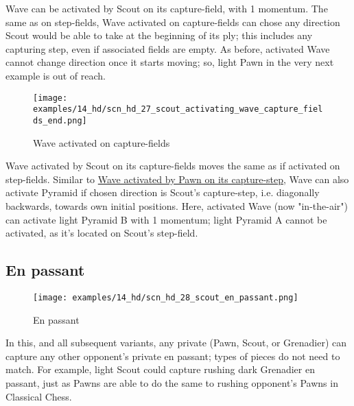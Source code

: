 \vspace*{-0.5\baselineskip}
Wave can be activated by Scout on its capture-field, with 1 momentum. The same as
on step-fields, Wave activated on capture-fields can chose any direction Scout would
be able to take at the beginning of its ply; this includes any capturing step, even
if associated fields are empty.\newline
\indent
As before, activated Wave cannot change direction once it starts moving; so, light
Pawn in the very next example is out of reach.

\clearpage %

\vspace*{-2.3\baselineskip}
\noindent
\begin{figure}[!h]
\texttt{[image: examples/14\_hd/scn\_hd\_27\_scout\_activating\_wave\_capture\_fields\_end.png]}
\vspace*{-1.4\baselineskip}
\caption{Wave activated on capture-fields}
\label{fig:scn_hd_27_scout_activating_wave_capture_fields_end}
\end{figure}

\vspace*{-0.5\baselineskip}
Wave activated by Scout on its capture-fields moves the same as if activated on
step-fields. Similar to
\hyperref[fig:scn_mv_028_wave_activated_by_capture_pawn]{Wave activated by Pawn on its capture-step},
Wave can also activate Pyramid if chosen direction is Scout's capture-step, i.e.
diagonally backwards, towards own initial positions.\newline
\indent
Here, activated Wave (now "in-the-air") can activate light Pyramid B with 1 momentum;
light Pyramid A cannot be activated, as it's located on Scout's step-field.

\clearpage %

\subsection*{En passant}
\label{sec:Hemera's Dawn/Scout/En passant}

\vspace*{-0.7\baselineskip}
\noindent
\begin{wrapfigure}[14]{l}{0.4\textwidth}
\centering
\texttt{[image: examples/14\_hd/scn\_hd\_28\_scout\_en\_passant.png]}
\vspace*{-0.3\baselineskip}
\caption{En passant}
\label{fig:scn_hd_28_scout_en_passant}
\end{wrapfigure}
\indent
In this, and all subsequent variants, any private (Pawn, Scout, or Grenadier) can
capture any other opponent's private en passant; types of pieces do not need to
match.\newline
\indent
For example, light Scout could capture rushing dark Grenadier en passant, just as
Pawns are able to do the same to rushing opponent's Pawns in Classical Chess.

